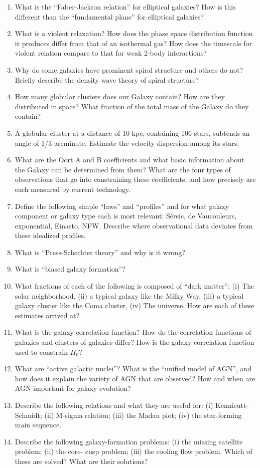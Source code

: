 \documentclass[10pt, oneside]{book}
\begin{document}
\begin{enumerate}[start=100]
    \item What is the ``Faber-Jackson relation'' for elliptical galaxies? How is this different than the ``fundamental plane'' for elliptical galaxies?
    \item What is a violent relaxation? How does the phase space distribution function it produces differ from that of an isothermal gas? How does the timescale for violent relation compare to that for weak 2-body interactions?
    \item Why do some galaxies have prominent spiral structure and others do not? Briefly describe the density wave theory of spiral structure?
    \item How many globular clusters does our Galaxy contain? How are they distributed in space? What fraction of the total mass of the Galaxy do they contain?
    \item A globular cluster at a distance of 10 kpc, containing 106 stars, subtends an angle of 1/3 arcminute. Estimate the velocity dispersion among its stars.
    \item What are the Oort A and B coefficients and what basic information about the Galaxy can be determined from them? What are the four types of observations that go into constraining these coefficients, and how precisely are each measured by current technology.
    \item Define the following simple ``laws'' and ``profiles'' and for what galaxy component or galaxy type each is most relevant: Sérsic, de Vaucouleurs, exponential, Einasto, NFW. Describe where observational data deviates from these idealized profiles.
    \item What is ``Press-Schechter theory'' and why is it wrong?
    \item What is ``biased galaxy formation''?
    \item What fractions of each of the following is composed of ``dark matter'': (i) The solar neighborhood, (ii) a typical galaxy like the Milky Way, (iii) a typical galaxy cluster like the Coma cluster, (iv) The universe. How are each of these estimates arrived at?
    \item What is the galaxy correlation function? How do the correlation functions of galaxies and clusters of galaxies differ? How is the galaxy correlation function used to constrain $H_{0}$?
    \item What are ``active galactic nuclei''? What is the ``unified model of AGN'', and how does it explain the variety of AGN that are observed? How and when are AGN important for galaxy evolution?
    \item Describe the following relations and what they are useful for: (i) Kennicutt-Schmidt; (ii) M-sigma relation; (iii) the Madau plot; (iv) the star-forming main sequence.
    \item Describe the following galaxy-formation problems: (i) the missing satellite problem; (ii) the core- cusp problem; (iii) the cooling flow problem. Which of these are solved? What are their solutions?
\end{enumerate}
\end{document}
